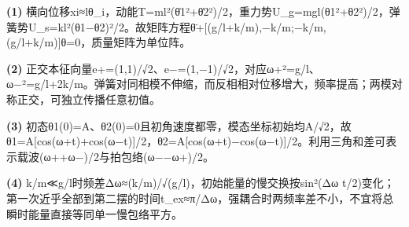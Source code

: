 \par\noindent\textbf{(1)} 横向位移xi≈lθ\_i，动能T=ml²(θ̇1²+θ̇2²)/2，重力势U\_g=mgl(θ1²+θ2²)/2，弹簧势U\_s=kl²(θ1−θ2)²/2。故矩阵方程θ̈+[(g/l+k/m),−k/m;−k/m,(g/l+k/m)]θ=0，质量矩阵为单位阵。
\par\noindent\textbf{(2)} 正交本征向量e+=(1,1)/√2、e−=(1,−1)/√2，对应ω+²=g/l、ω−²=g/l+2k/m。弹簧对同相模不伸缩，而反相相对位移增大，频率提高；两模对称正交，可独立传播任意初值。
\par\noindent\textbf{(3)} 初态θ1(0)=A、θ2(0)=0且初角速度都零，模态坐标初始均A/√2，故θ1=A[cos(ω+t)+cos(ω−t)]/2，θ2=A[cos(ω+t)−cos(ω−t)]/2。利用三角和差可表示载波(ω++ω−)/2与拍包络(ω−−ω+)/2。
\par\noindent\textbf{(4)} k/m≪g/l时频差Δω≈(k/m)/√(g/l)，初始能量的慢交换按sin²(Δω t/2)变化；第一次近乎全部到第二摆的时间t\_ex≈π/Δω，强耦合时两频率差不小，不宜将总瞬时能量直接等同单一慢包络平方。
